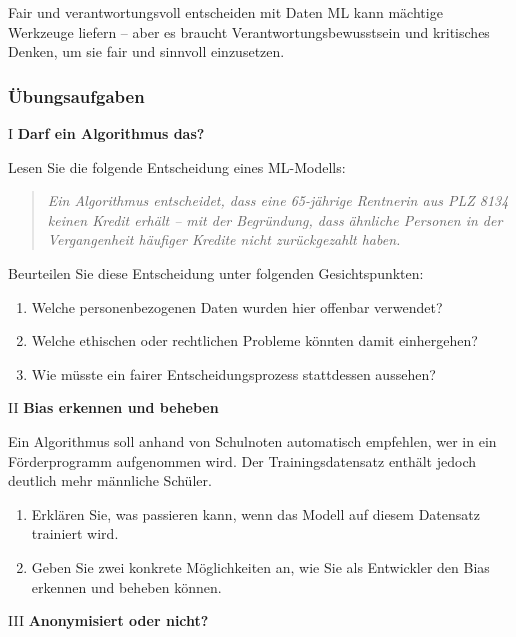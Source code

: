 \begin{lpu}{Fair und verantwortungsvoll entscheiden mit Daten}
ML kann mächtige Werkzeuge liefern – aber es braucht Verantwortungsbewusstsein und kritisches Denken, um sie fair und sinnvoll einzusetzen.

\subsubsection*{Übungsaufgaben}

\begin{aufgabe}{I}
\textbf{Darf ein Algorithmus das?}

Lesen Sie die folgende Entscheidung eines ML-Modells:

\begin{quote}
  \emph{Ein Algorithmus entscheidet, dass eine 65-jährige Rentnerin aus PLZ 8134 keinen Kredit erhält – mit der Begründung, dass ähnliche Personen in der Vergangenheit häufiger Kredite nicht zurückgezahlt haben.}
\end{quote}

Beurteilen Sie diese Entscheidung unter folgenden Gesichtspunkten:

\begin{enumerate}
  \item Welche personenbezogenen Daten wurden hier offenbar verwendet?
  \item Welche ethischen oder rechtlichen Probleme könnten damit einhergehen?
  \item Wie müsste ein fairer Entscheidungsprozess stattdessen aussehen?
\end{enumerate}
\end{aufgabe}

\begin{aufgabe}{II}
\textbf{Bias erkennen und beheben}

Ein Algorithmus soll anhand von Schulnoten automatisch empfehlen, wer in ein Förderprogramm aufgenommen wird. Der Trainingsdatensatz enthält jedoch deutlich mehr männliche Schüler.

\begin{enumerate}
  \item Erklären Sie, was passieren kann, wenn das Modell auf diesem Datensatz trainiert wird.
  \item Geben Sie zwei konkrete Möglichkeiten an, wie Sie als Entwickler den Bias erkennen und beheben können.
\end{enumerate}
\end{aufgabe}

\begin{aufgabe}{III}
\textbf{Anonymisiert oder nicht?}


\end{aufgabe}
\end{lpu}
